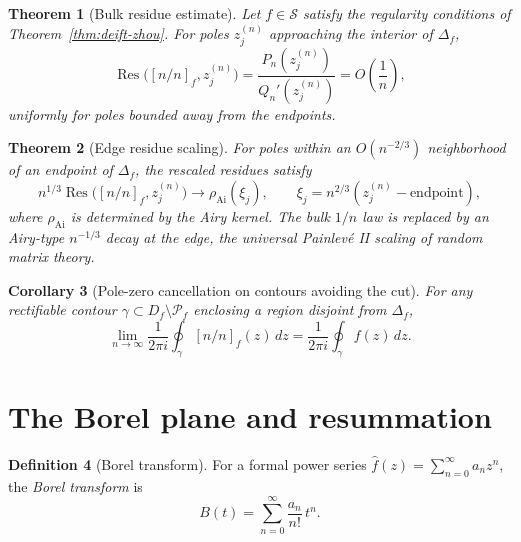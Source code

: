 \documentclass[11pt]{article}
\newtheorem{theorem}{Theorem}[section]
\newtheorem{corollary}[theorem]{Corollary}
\theoremstyle{definition}
\newtheorem{definition}[theorem]{Definition}
\theoremstyle{remark}
\DeclareMathOperator{\Res}{Res}
\begin{document}
\begin{theorem}[Bulk residue estimate]
\label{thm:residue-bulk}
Let $f\in\mathcal{S}$ satisfy the regularity conditions of Theorem~\ref{thm:deift-zhou}. For poles $z_{j}^{(n)}$ approaching the interior of $\Delta_{f}$,
\begin{equation}
\Res\bigl([n/n]_{f},z_{j}^{(n)}\bigr)=
\frac{P_{n}(z_{j}^{(n)})}{Q_{n}'(z_{j}^{(n)})}
=O\!\left(\frac{1}{n}\right),
\label{eq:residue-bulk}
\end{equation}
uniformly for poles bounded away from the endpoints.
\end{theorem}

\begin{theorem}[Edge residue scaling]
\label{thm:residue-edge}
For poles within an $O(n^{-2/3})$ neighborhood of an endpoint of $\Delta_{f}$, the rescaled residues satisfy
\begin{equation}
n^{1/3}\Res\bigl([n/n]_{f},z_{j}^{(n)}\bigr)\to\rho_{\mathrm{Ai}}(\xi_{j}),
\qquad\xi_{j}=n^{2/3}(z_{j}^{(n)}-\text{endpoint}),
\label{eq:residue-edge}
\end{equation}
where $\rho_{\mathrm{Ai}}$ is determined by the Airy kernel. The bulk $1/n$ law is replaced by an Airy-type $n^{-1/3}$ decay at the edge, the universal Painlev\'e II scaling of random matrix theory.
\end{theorem}

\begin{corollary}[Pole-zero cancellation on contours avoiding the cut]
\label{cor:cancellation}
For any rectifiable contour $\gamma\subset D_{f}\setminus\mathcal{P}_{f}$ enclosing a region disjoint from $\Delta_{f}$,
\begin{equation}
\lim_{n\to\infty}\frac{1}{2\pi i}\oint_{\gamma}[n/n]_{f}(z)\,dz
=\frac{1}{2\pi i}\oint_{\gamma}f(z)\,dz.
\label{eq:contour-integral}
\end{equation}
\end{corollary}

\section{The Borel plane and resummation}
\label{sec:borel}

\begin{definition}[Borel transform]
\label{def:borel}
For a formal power series $\hat{f}(z)=\sum_{n=0}^{\infty}a_{n}z^{n}$, the \emph{Borel transform} is
\begin{equation}
B(t)=\sum_{n=0}^{\infty}\frac{a_{n}}{n!}\,t^{n}.
\label{eq:borel-transform}
\end{equation}
\end{definition}
\end{document}

